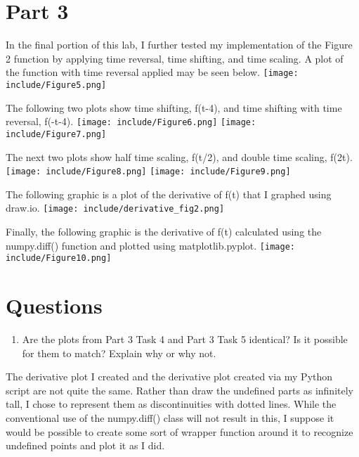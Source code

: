 \documentclass[12pt]{article}
\begin{document}
\section{Part 3}
    \par In the final portion of this lab, I further tested my implementation of the Figure 2 function by applying time reversal, time shifting, and time scaling. A plot of the function with time reversal applied may be seen below.
    \newline
    \newline
    \texttt{[image: include/Figure5.png]}
    \par The following two plots show time shifting, f(t-4), and time shifting with time reversal, f(-t-4).
    \newline
    \newline
    \texttt{[image: include/Figure6.png]}
    \texttt{[image: include/Figure7.png]}
    \par The next two plots show half time scaling, f(t/2), and double time scaling, f(2t).
    \newline
    \newline
    \texttt{[image: include/Figure8.png]}
    \texttt{[image: include/Figure9.png]}
    \par The following graphic is a plot of the derivative of f(t) that I graphed using draw.io.
    \newline
    \newline
    \texttt{[image: include/derivative\_fig2.png]}
    \par Finally, the following graphic is the derivative of f(t) calculated using the numpy.diff() function and plotted using matplotlib.pyplot.
    \newline
    \newline
    \texttt{[image: include/Figure10.png]}
    
\newpage
\section*{Questions}

\begin{enumerate}
    \item Are the plots from Part 3 Task 4 and Part 3 Task 5 identical? Is it possible for them to match? Explain why or why not.
\end{enumerate}
    \par The derivative plot I created and the derivative plot created via my Python script are not quite the same. Rather than draw the undefined parts as infinitely tall, I chose to represent them as discontinuities with dotted lines. While the conventional use of the numpy.diff() class will not result in this, I suppose it would be possible to create some sort of wrapper function around it to recognize undefined points and plot it as I did.
    
\end{document}
